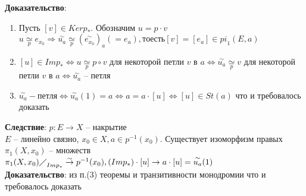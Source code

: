 	\textbf{Доказательство}:
	\begin{enumerate}
	\item Пусть $[v] \in Ker p_{\ast}$. Обозначим $u = p\cdot v$\\
		$u \underset{p}{\simeq} e_{x_0} \Rightarrow \overset{\sim}{u_a} \underset{p}{\simeq} {(\overset{\sim}{e_{x_0}})}_a ( = e_a), то есть [v] = [e_a] \in {pi}_1 (E,a)$
	\item $[u]\in Im p_{\ast} \Leftrightarrow u \underset{p}{\simeq} p \circ v$ для некоторой петли $v$ в $a \Leftrightarrow \overset{\sim}{u_a} \underset{p}{\simeq} v$ для некоторой петли $v$ в $a \Leftrightarrow \overset{\sim}{u_a}$ -- петля
	\item $\overset{\sim}{u_a} -петля \Leftrightarrow \overset{\sim}{u_a} (1) = a \Leftrightarrow a = a\cdot [u] \Leftrightarrow [u] \in St(a)$ что и требовалось доказать
	\end{enumerate}
	\textbf{Следствие}: $p: E\rightarrow X$ -- накрытие\\
	$E$ -- линейно связно, $x_0 \in X, a\in p^{-1} (x_0)$. Существует изоморфизм правых ${\pi}_1 (X,x_0)$ -- множеств\\
	${{\pi}_1 (X,x_0) \diagup}_{Im p_{\ast}} \overset{\sim}{\rightarrow} p^{-1} (x_0), (Im p_{\ast})\cdot [u] \rightarrow a\cdot [u] = \overset{\sim}{u_a} (1)$\\
	\textbf{Доказательство}: из п.(3) теоремы и транзитивности монодромии что и требовалось доказать
	


\newpage

